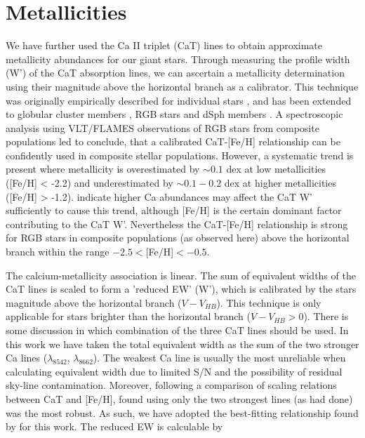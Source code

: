 \documentclass{emulateapj}
\begin{document}
 
		
\section{Metallicities}
	\label{sec:metallicities}
	We have further used the Ca II triplet (CaT) lines to obtain approximate metallicity abundances  for our giant stars. Through measuring the profile width (W') of the CaT absorption lines, we can ascertain a metallicity determination using their magnitude above the horizontal branch as a calibrator. This technique was originally empirically described for individual stars \citep{Armandroff;Da-Costa_1991}, and has been extended to globular cluster members \citep{Rutledge;Hesser;Stetson_1997}, RGB stars and dSph members \citep{Battaglia;et-al_2008}. A spectroscopic analysis using VLT/FLAMES observations of RGB stars from composite populations led\citet{Battaglia;et-al_2008} to conclude, that a calibrated CaT-[Fe/H] relationship can be confidently used in composite stellar populations. However, a systematic trend is present where metallicity is overestimated by $\sim0.1$ dex at low metallicities ([Fe/H] < -2.2) and underestimated by $\sim0.1-0.2$ dex at higher metallicities ([Fe/H] > -1.2). \citet{Battaglia;et-al_2008} indicate higher Ca abundances may affect the CaT W' sufficiently to cause this trend, although [Fe/H] is the certain dominant factor contributing to the CaT W'. Nevertheless the CaT-[Fe/H] relationship is strong for RGB stars in composite populations (as observed here) above the horizontal branch within the range $-2.5 < $[Fe/H]$ < -0.5$.
	
The calcium-metallicity association is linear. The sum of equivalent widths of the CaT lines is scaled to form a 'reduced EW' (W'), which is calibrated by the stars magnitude above the horizontal branch ($V - V_{HB}$). This technique is only applicable for stars brighter than the horizontal branch ($V - V_{HB} > 0$). There is some discussion in which combination of the three CaT lines should be used. In this work we have taken the total equivalent width as the sum of the two stronger Ca lines ($\lambda_{8542}$, $\lambda_{8662}$). The weakest Ca line is usually the most unreliable when calculating equivalent width due to limited S/N and the possibility of residual sky-line contamination. Moreover, following a comparison of scaling relations between CaT and [Fe/H], \citet{Battaglia;et-al_2008} found using only the two strongest lines (as \citet{Tolstoy;et-al_2001} had done) was the most robust. As such, we have adopted the best-fitting relationship found by \citet{Battaglia;et-al_2008} for this work. The reduced EW is calculable by
\end{document}
